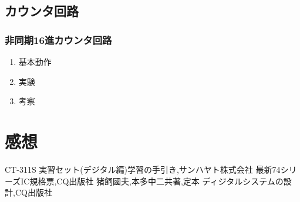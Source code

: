 \documentclass[twocolumn, 10pt,a4j]{jsarticle}
\begin{document}
\subsection{カウンタ回路}
  \subsubsection{非同期16進カウンタ回路}
  \begin{enumerate}
    \item 基本動作
    \item 実験
    \item 考察
  \end{enumerate}
\section{感想}


\begin{thebibliography}{3}
\bibitem{}CT-311S 実習セット(デジタル編)学習の手引き,サンハヤト株式会社
\bibitem{}最新74シリーズIC規格票,CQ出版社
\bibitem{}猪飼國夫,本多中二共著,定本 ディジタルシステムの設計,CQ出版社
\end{thebibliography}
\end{document}
